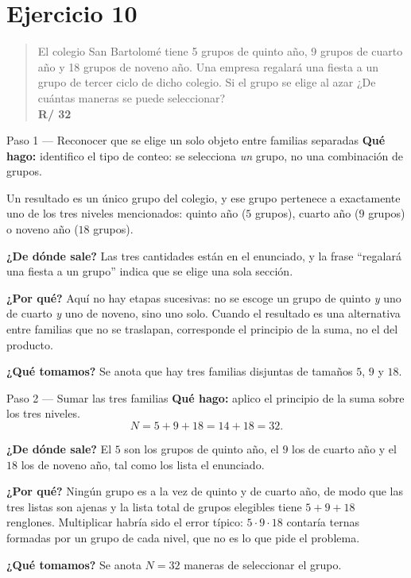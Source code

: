 \documentclass[11pt]{article}
\begin{document}
\section*{Ejercicio 10}

\begin{quote}
El colegio San Bartolomé tiene 5 grupos de quinto año, 9 grupos de cuarto año y 18 grupos de noveno año. Una empresa regalará una fiesta a un grupo de tercer ciclo de dicho colegio. Si el grupo se elige al azar ¿De cuántas maneras se puede seleccionar?\\[2pt]
\textbf{R/ 32}
\end{quote}

\begin{paso}{Paso 1 --- Reconocer que se elige un solo objeto entre familias separadas}
\textbf{Qué hago:} identifico el tipo de conteo: se selecciona \emph{un} grupo, no una combinación de grupos.

Un resultado es un único grupo del colegio, y ese grupo pertenece a exactamente uno de los tres niveles mencionados: quinto año ($5$ grupos), cuarto año ($9$ grupos) o noveno año ($18$ grupos).

\textbf{¿De dónde sale?} Las tres cantidades están en el enunciado, y la frase ``regalará una fiesta a un grupo'' indica que se elige una sola sección.

\textbf{¿Por qué?} Aquí no hay etapas sucesivas: no se escoge un grupo de quinto \emph{y} uno de cuarto \emph{y} uno de noveno, sino uno solo. Cuando el resultado es una alternativa entre familias que no se traslapan, corresponde el principio de la suma, no el del producto.

\textbf{¿Qué tomamos?} Se anota que hay tres familias disjuntas de tamaños $5$, $9$ y $18$.
\end{paso}

\begin{paso}{Paso 2 --- Sumar las tres familias}
\textbf{Qué hago:} aplico el principio de la suma sobre los tres niveles.
\[
  N = 5+9+18 = 14+18 = 32 .
\]

\textbf{¿De dónde sale?} El $5$ son los grupos de quinto año, el $9$ los de cuarto año y el $18$ los de noveno año, tal como los lista el enunciado.

\textbf{¿Por qué?} Ningún grupo es a la vez de quinto y de cuarto año, de modo que las tres listas son ajenas y la lista total de grupos elegibles tiene $5+9+18$ renglones. Multiplicar habría sido el error típico: $5\cdot 9\cdot 18$ contaría ternas formadas por un grupo de cada nivel, que no es lo que pide el problema.

\textbf{¿Qué tomamos?} Se anota $N=32$ maneras de seleccionar el grupo.
\end{paso}
\end{document}
